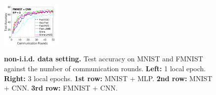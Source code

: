 \documentclass[nohyperref]{article}
\theoremstyle{plain}
\theoremstyle{definition}
\theoremstyle{remark}
\begin{document}
\begin{figure}[t]
\begin{center}
{        \hspace{-0.1in}\includegraphics[width=0.26\textwidth]{figure_mime/fmnist_testerror_cnn_ep3_iid0_mime.pdf}
        }
    \end{center}
	\caption{\textbf{non-i.i.d. data setting.} Test accuracy on MNIST and FMNIST against the number of communication rounds. \textbf{Left:} 1 local epoch. \textbf{Right:} 3 local epochs. \textbf{1st row:} MNIST + MLP. \textbf{2nd row:} MNIST + CNN. \textbf{3rd row:} FMNIST + CNN.}
	\label{fig:noniid}	\vspace{-0.1in}
\end{figure}


\begin{table}[t]
\centering
\caption{Test Accuracy with ResNet-18 Network.}\label{tab:acc}
\vspace{-0.1in}
\end{table}
\end{document}
